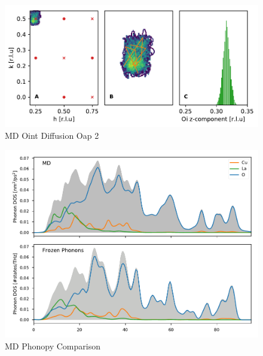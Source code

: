 \begin{figure}
	\centering
	\includegraphics[width=\textwidth]{fig/md/diffusion3.pdf}
	\caption[MD Oint Diffusion Oap 2]{MD Oint Diffusion Oap 2}
	\label{fig:md_diffusion3}
\end{figure}


\begin{figure}
	\centering
	\includegraphics[width=\textwidth]{fig/md/md_phonopy_comparison.pdf}
	\caption[MD Phonopy Comparison]{MD Phonopy Comparison}
	\label{fig:md_phonopy_comparison}
\end{figure}